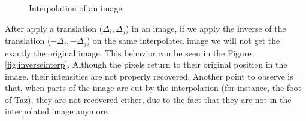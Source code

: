 \documentclass{article}
\begin{document}
	\begin{figure}[H]
		  \centering
		  \hspace{0.1cm}
		  \caption{Interpolation of an image}
		  \hspace{0.1cm}
		  \label{fig:interp}
	\end{figure}		

	

	After apply a translation ($\Delta_i,\Delta_j$) in an image, if we apply the inverse of the translation ($-\Delta_i,-\Delta_j$) on the same interpolated image we will not get the exactly the original image. This behavior can be seen in the Figure \ref{fig:inverseinterp}. Although the pixels return to their original position in the image, their intensities are not properly recovered. Another point to observe is that, when parts of the image are cut by the interpolation (for instance, the foot of Taz), they are not recovered either, due to the fact that they are not in the interpolated image anymore.
\end{document}

